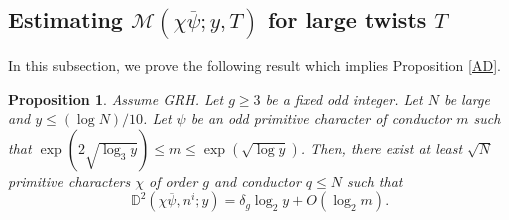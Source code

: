 \documentclass[12pt]{amsart}
\newtheorem{pro}[thm]{Proposition}
\theoremstyle{definition}
\numberwithin{equation}{section}
\newcommand{\mb}{\mathbb}
\newcommand{\mc}{\mathcal}
\renewcommand{\bar}{\overline}
\begin{document}
\subsection{Estimating $\mc{M}(\chi\bar{\psi}; y, T)$ for large twists $T$} In this subsection, we prove the following result which implies Proposition \ref{AD}. 
\begin{pro} \label{AD2}
Assume GRH.  Let $g\geq 3$ be a fixed odd integer. Let $N$ be large and $y\leq (\log N)/10$. Let $\psi$ be an odd primitive character of conductor $m$ such that  $\exp\left(2\sqrt{\log_3 y}\right) \leq m\leq \exp\left(\sqrt{\log y}\right)$. Then, there exist at least $\sqrt{N}$  primitive characters $\chi$ of order $g$ and conductor $q\leq N$ such that 
\begin{equation*}
\mb{D}^2(\chi\bar{\psi}, n^i;y) = \delta_g \log_2 y + O\left(\log_2 m\right).
\end{equation*}
\end{pro}
\end{document}
